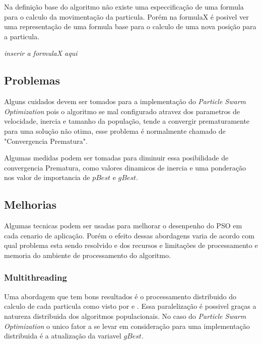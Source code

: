         Na definição base do algoritmo não existe uma especcificação de uma formula para o calculo da movimentação da particula. Porém na formulaX é posivel ver uma representação de uma formula base para o calculo de uma nova posição para a particula.

        \textit{inserir a formulaX aqui}

    

    \subsection{Problemas}
        Alguns cuidados devem ser tomados para a implementação do \textit{Particle Swarm Optimization} pois o algoritmo se mal configurado atravez dos parametros de velocidade, inercia e tamanho da população, tende a convergir prematuramente para uma solução não otima, esse problema é normalmente chamado de "Convergencia Prematura".\newline
        
        Algumas medidas podem ser tomadas para diminuir essa posibilidade de convergencia Prematura, como valores dinamicos de inercia e uma ponderação nos valor de importancia de $pBest$ e $gBest$.


    \subsection{Melhorias}
            Algumas tecnicas podem ser usadas para melhorar o desenpenho do PSO em cada cenario de aplicação. Porém o efeito dessas abordagens varia de acordo com qual problema esta sendo resolvido e dos recursos e limitações de processamento e memoria do ambiente de processamento do algoritmo.

        \subsubsection{Multithreading}
            Uma abordagem que tem bons resultados é o processamento distribuido do calculo de cada particula como visto por \cite{Thongkrairat2019} e \cite{Kim2011}. Essa paralelização é possivel graças a natureza distribuida dos algoritmos populacionais. No caso do \textit{Particle Swarm Optimization} o unico fator a se levar em consideração para uma implementação distribuida é a atualização da variavel $gBest$.\newline
            
